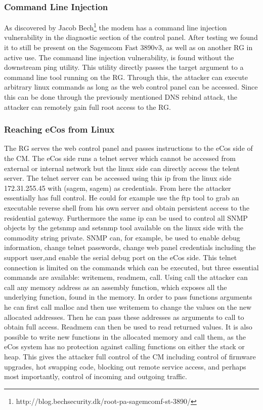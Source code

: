 \subsubsection{Command Line Injection}
As discovered by Jacob Bech\footnote{http://blog.bechsecurity.dk/root-pa-sagemcomf-st-3890/} the modem has a command line injection vulnerability in the diagnostic section of the control panel.
After testing we found it to still be present on the Sagemcom Fast 3890v3, as well as on another RG in active use.
The command line injection vulnerability, is found without the downstream ping utility.
This utility directly passes the target argument to a command line tool running on the RG. 
Through this, the attacker can execute arbitrary linux commands as long as the web control panel can be accessed. Since this can be done through the previously mentioned DNS rebind attack, the attacker can remotely gain full root access to the RG.

\subsubsection{Reaching eCos from Linux}
The RG serves the web control panel and passes instructions to the eCos side of the CM.
The eCos side runs a telnet server which cannot be accessed from external or internal network but the linux side can directly access the telent server.
The telnet server can be accessed using this ip from the linux side 172.31.255.45 with (sagem, sagem) as credentials.
From here the attacker essentially has full control. 
He could for example use the ftp tool to grab an executable reverse shell from his own server and obtain persistent
access to the residential gateway.
Furthermore the same ip can be used to control all SNMP objects by the getsnmp and setsnmp tool available on the linux side with the commodity string private. 
SNMP can, for example, be used to enable debug information, change telnet passwords, change web panel credentials including the support user,and enable the serial debug port on the eCos side.
This telnet connection is limited on the commands which can be executed, but three essential commands are available: writemem, readmem, call. 
Using call the attacker can call any memory address as an assembly function, which exposes all the underlying function, found in the memory. 
In order to pass functions arguments he can first call malloc and then use writemem to change the values on the new allocated addresses.
Then he can pass these addresses as arguments to call to obtain full access.
Readmem can then be used to read returned values.
It is also possible to write new functions in the allocated memory and call them, as the eCos system has no protection against calling
functions on either the stack or heap.
This gives the attacker full control of the CM including control of firmware upgrades, hot swapping code, blocking out remote service access, and perhaps most importantly, control of incoming and outgoing traffic.
